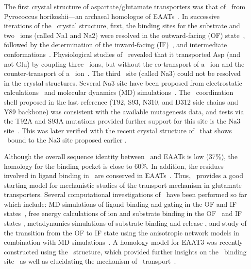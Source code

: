 The first crystal structure of aspartate/glutamate transporters was that of \GltPh\ from 
Pyrococcus horikoshii—an archaeal homologue of EAATs~\cite{Yernool2004}. In successive 
iterations of the \GltPh\ crystal structure, first, the binding sites for the substrate and two 
\Na\ ions (called Na1 and Na2) were resolved in the outward-facing (OF) state~\cite{Boudker2007}, 
followed by the determination of the inward-facing (IF)~\cite{Reyes2009}, and intermediate 
conformations~\cite{Verdon2012}. Physiological studies of \GltPh\ revealed that it transported 
Asp (and not Glu) by coupling three \Na\ ions, but without the co-transport of a \Hi\ ion and 
the counter-transport of a \K\ ion~\cite{Ryan2009,Groeneveld2010}. The third \Na\ site (called 
Na3) could not be resolved in the crystal structures. Several Na3 site have been proposed from 
electrostatic calculations~\cite{Holley2009} and molecular dynamics (MD) 
simulations~\cite{Bastug2012,Larsson2010,Huang2010}. The \Na\ coordination shell proposed in 
the last reference (T92, S93, N310, and D312 side chains and Y89 backbone) was consistent with 
the available mutagenesis data, and tests via the T92A and S93A mutations provided further 
support for this site is the Na3 site~\cite{Bastug2012}. This was later verified with the 
recent crystal structure of \GltTk\ that shows \Na\ bound to the Na3 site proposed earlier 
\cite{Guskov2016}.

Although the overall sequence identity between \GltPh\ and EAATs is low (37\%), the homology 
for the binding pocket is close to 60\%. In addition, the residues involved in ligand binding 
in \GltPh\ are conserved in EAATs~\cite{Arriza1997,Vandenberg2013,Yernool2004,Boudker2007}. 
Thus, \GltPh\ provides a good starting model for mechanistic studies of the transport mechanism 
in glutamate transporters. Several computational investigations of \GltPh\ have been performed 
so far which include: MD simulations of ligand binding and gating in the OF 
\cite{Huang2008,Huang2010,Shrivastava2008} and IF states~\cite{Zomot2013}, free energy 
calculations of ion and substrate binding in the OF~\cite{Larsson2010,Heinzelmann2011} and IF 
states \cite{Heinzelmann2013}, metadynamics simulations of substrate binding and release 
\cite{Grazioso2012}, and study of the transition from the OF to IF state using the anisotropic 
network models in combination with MD simulations~\cite{Jiang2011,Das2014}. A homology model 
for EAAT3 was recently constructed using the \GltPh\ structure, which provided further insights 
on the \K\ binding site~\cite{Heinzelmann2014} as well as elucidating the mechanism of \Hi\ 
transport~\cite{Heinzelmann2014a}.

